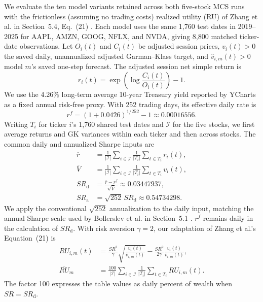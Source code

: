 \documentclass[12pt,a4paper]{article}
\numberwithin{equation}{section}
\numberwithin{table}{section}
\numberwithin{figure}{section}
\begin{document}
We evaluate the ten model variants retained across both five-stock MCS runs with the frictionless (assuming no trading costs) realized utility (RU) of Zhang et al. in Section~5.4, Eq.~(21) \cite{zhang2022}. Each model uses the same 1,760 test dates in 2019--2025 for AAPL, AMZN, GOOG, NFLX, and NVDA, giving 8,800 matched ticker-date observations. Let $O_i(t)$ and $C_i(t)$ be adjusted session prices, $v_i(t)>0$ the saved daily, unannualized adjusted Garman--Klass target, and $\widehat v_{i,m}(t)>0$ model $m$'s saved one-step forecast. The adjusted session net simple return is
\begin{equation}\label{eq:utility-return}
r_i(t)=\exp\!\left(\log\frac{C_i(t)}{O_i(t)}\right)-1.
\end{equation}
We use the 4.26\% long-term average 10-year Treasury yield reported by YCharts \cite{ycharts10y} as a fixed annual risk-free proxy. With 252 trading days, its effective daily rate is
\begin{equation}\label{eq:utility-risk-free}
r^f=(1+0.0426)^{1/252}-1\approx0.00016556.
\end{equation}
Writing $T_i$ for ticker $i$'s 1,760 shared test dates and $\mathcal I$ for the five stocks, we first average returns and GK variances within each ticker and then across stocks. The common daily and annualized Sharpe inputs are
\begin{equation}\label{eq:utility-sharpe}
\begin{aligned}
\overline r&=\frac{1}{|\mathcal I|}\sum_{i\in\mathcal I}\frac{1}{|T_i|}\sum_{t\in T_i}r_i(t),\\
\overline V&=\frac{1}{|\mathcal I|}\sum_{i\in\mathcal I}\frac{1}{|T_i|}\sum_{t\in T_i}v_i(t),\\
SR_{\mathrm d}&=\frac{\overline r-r^f}{\sqrt{\overline V}}\approx0.03447937,\\
SR_{\mathrm a}&=\sqrt{252}\,SR_{\mathrm d}\approx0.54734298.
\end{aligned}
\end{equation}
We apply the conventional $\sqrt{252}$ annualization to the daily input, matching the annual Sharpe scale used by Bollerslev et al. in Section~5.1 \cite{bollerslev2018risk}. $r^f$ remains daily in the calculation of $SR_{\mathrm d}$.
With risk aversion $\gamma=2$, our adaptation of Zhang et al.'s Equation~(21) is
\begin{equation}\label{eq:utility-ru}
\begin{aligned}
RU_{i,m}(t)&=\frac{SR^2}{\gamma}\sqrt{\frac{v_i(t)}{\widehat v_{i,m}(t)}}
-\frac{SR^2}{2\gamma}\frac{v_i(t)}{\widehat v_{i,m}(t)},\\
\overline{RU}_m&=\frac{100}{|\mathcal I|}\sum_{i\in\mathcal I}\frac{1}{|T_i|}\sum_{t\in T_i}RU_{i,m}(t).
\end{aligned}
\end{equation}
The factor 100 expresses the table values as daily percent of wealth when $SR=SR_{\mathrm d}$.
\end{document}
